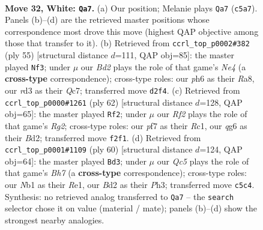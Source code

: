 \documentclass[11pt]{article}
\begin{document}
\clearpage

\begin{figure}[p]\centering
\begin{subfigure}{0.46\textwidth}\centering
\resizebox{\linewidth}{!}{%
\newchessgame
\chessboard[
  setfen={nr4k1/5pb1/p5qp/2Q1p3/4P2n/1P1r1P2/1P1B1RN1/RN4K1 w - - 0 32},
  showmover=false,
  pgfstyle=straightmove, color=movearrow, markmove={c5-a7}
]}
\caption{}
\end{subfigure}\hfill
\begin{subfigure}{0.46\textwidth}\centering
\resizebox{\linewidth}{!}{%
\newchessgame
\chessboard[
  setfen={r6k/2q2prn/p2N4/3Rn1P1/1p3p1Q/8/PPP1N2P/1K4R1 b - - 2 28},
  showmover=false,
  pgfstyle=straightmove, color=movearrow, markmove={e5-f3}
]}
\caption{}
\end{subfigure}
\\[4pt]
\begin{subfigure}{0.46\textwidth}\centering
\resizebox{\linewidth}{!}{%
\newchessgame
\chessboard[
  setfen={1k1r1b2/1pp1nQp1/8/q3P3/1p1P4/4P2r/1P1B2RP/2R3K1 w - - 2 32},
  showmover=false,
  pgfstyle=straightmove, color=movearrow, markmove={g2-f2}
]}
\caption{}
\end{subfigure}\hfill
\begin{subfigure}{0.46\textwidth}\centering
\resizebox{\linewidth}{!}{%
\newchessgame
\chessboard[
  setfen={5r1k/pb2bppB/4p2p/npq3NQ/5P2/2P4P/P5P1/R3R2K w - - 8 31},
  showmover=false,
  pgfstyle=straightmove, color=movearrow, markmove={h7-d3}
]}
\caption{}
\end{subfigure}
\caption{\textbf{Move 32, White: \texttt{Qa7}.} (a) Our position; Melanie plays \texttt{Qa7} (\texttt{c5a7}). Panels (b)--(d) are the retrieved master positions whose correspondence most drove this move (highest QAP objective among those that transfer to it). (b) Retrieved from \texttt{ccrl\_top\_p0002\#382} (ply 55) [structural distance $d$=111, QAP obj=85]: the master played \texttt{Nf3}; under $\mu$ our \emph{Bd2} plays the role of that game's \emph{Ne4} (a \textbf{cross-type} correspondence); cross-type roles: our \emph{p}h6 as their \emph{R}a8, our \emph{r}d3 as their \emph{Q}c7; transferred move \texttt{d2f4}. (c) Retrieved from \texttt{ccrl\_top\_p0000\#1261} (ply 62) [structural distance $d$=128, QAP obj=65]: the master played \texttt{Rf2}; under $\mu$ our \emph{Rf2} plays the role of that game's \emph{Rg2}; cross-type roles: our \emph{p}f7 as their \emph{R}c1, our \emph{q}g6 as their \emph{B}d2; transferred move \texttt{f2f1}. (d) Retrieved from \texttt{ccrl\_top\_p0001\#1109} (ply 60) [structural distance $d$=124, QAP obj=64]: the master played \texttt{Bd3}; under $\mu$ our \emph{Qc5} plays the role of that game's \emph{Bh7} (a \textbf{cross-type} correspondence); cross-type roles: our \emph{N}b1 as their \emph{R}e1, our \emph{B}d2 as their \emph{P}h3; transferred move \texttt{c5c4}. Synthesis: no retrieved analog transferred to \texttt{Qa7} -- the \texttt{search} selector chose it on value (material / mate); panels (b)--(d) show the strongest nearby analogies.}
\label{fig:thought-m62}
\end{figure}
\end{document}
